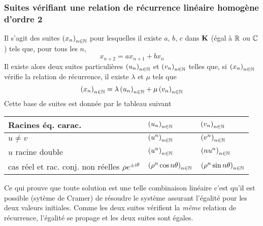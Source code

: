 \subsubsection{Suites vérifiant une relation de récurrence linéaire homogène d'ordre 2}
Il s'agit des suites $\left( x_n\right)_{n\in \mathbb{N}}$ pour lesquelles il existe $a$, $b$, $c$ dans $\mathbf{K}$ (égal à $\mathbb{R}$ ou $\mathbb{C}$) tels que, pour tous les $n$,
\begin{displaymath}
  x_{n+2} = ax_{n+1} + bx_n
\end{displaymath}
Il existe alors deux suites particulières $\left( u_n\right)_{n\in \mathbb{N}}$ et $\left( v_n\right)_{n\in \mathbb{N}}$ telles que, si $\left( x_n\right)_{n\in \mathbb{N}}$ vérifie la relation de récurrence, il existe $\lambda$ et $\mu$ tels que
\begin{displaymath}
  \left( x_n\right)_{n\in \mathbb{N}} = \lambda \left( u_n\right)_{n\in \mathbb{N}} + \mu \left( v_n\right)_{n\in \mathbb{N}}
\end{displaymath}
Cette base de suites est donnée par le tableau suivant
\begin{center}
\renewcommand{\arraystretch}{1.9}
\begin{tabular}{|l|l|l|}
\hline
Racines éq. carac.            & $\left( u_n\right)_{n\in \mathbb{N}}$ & $\left( v_n\right)_{n\in \mathbb{N}}$\\ \hline
$u \neq v$                    & $\left( u^n\right)_{n\in \mathbb{N}}$ & $\left( v^n\right)_{n\in \mathbb{N}}$\\ \hline
$u$ racine double             & $\left( u^n\right)_{n\in \mathbb{N}}$ & $\left( nu^n\right)_{n\in \mathbb{N}}$\\ \hline
cas réel et rac. conj. non réelles $\rho e^{\pm i\theta}$ & $\left( \rho^n\cos n\theta\right)_{n\in \mathbb{N}}$ & $\left( \rho^n\sin n\theta\right)_{n\in \mathbb{N}}$ \\ \hline
\end{tabular}
\end{center}
\begin{rem}
  Ce qui prouve que toute solution est une telle combinaison linéaire c'est qu'il est possible (sytème de Cramer) de résoudre le système assurant l'égalité pour les deux valeurs initiales. Comme les deux suites vérifient la \emph{même} relation de récurrence, l'égalité se propage et les deux suites sont égales.
\end{rem}

